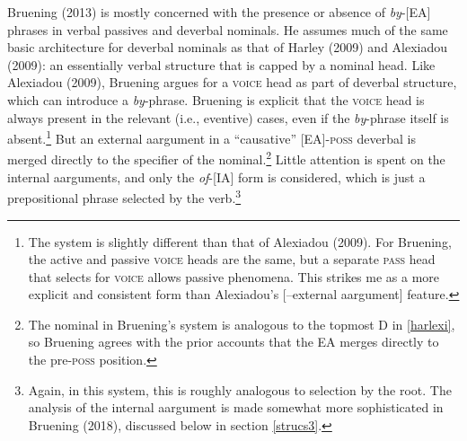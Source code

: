 \documentclass[12pt]{article}
\begin{document}
Bruening (2013) is mostly concerned with the presence or absence of \textit{by}-[EA] phrases in verbal passives and deverbal nominals. He assumes much of the same basic architecture for deverbal nominals as that of Harley (2009) and Alexiadou (2009): an essentially verbal structure that is capped by a nominal head. Like Alexiadou (2009), Bruening argues for a \textsc{voice} head as part of deverbal structure, which can introduce a \textit{by}-phrase. Bruening is explicit that the \textsc{voice} head is always present in the relevant (i.e., eventive) cases, even if the \textit{by}-phrase itself is absent.\footnote{ The system is slightly different than that of Alexiadou (2009). For Bruening, the active and passive \textsc{voice} heads are the same, but a separate \textsc{pass} head that selects for \textsc{voice} allows passive phenomena. This strikes me as a more explicit and consistent form than Alexiadou's [--external aargument] feature.} But an external aargument in a ``causative'' [EA]-\textsc{poss} deverbal is merged directly to the specifier of the nominal.\footnote{ The nominal in Bruening's system is analogous to the topmost D in \ref{harlexi}, so Bruening agrees with the prior accounts that the EA merges directly to the pre-\textsc{poss} position.} Little attention is spent on the internal aarguments, and only the \textit{of}-[IA] form is considered, which is just a prepositional phrase selected by the verb.\footnote{ Again, in this system, this is roughly analogous to selection by the root. The analysis of the internal aargument is made somewhat more sophisticated in Bruening (2018), discussed below in section \ref{strucs3}.}
\end{document}

